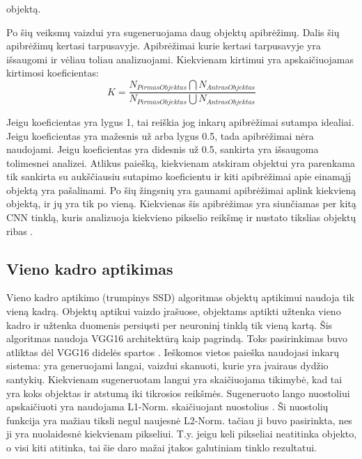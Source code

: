 \documentclass{VUMIFInfKursinis}
\begin{document}
objektą. \cite{salt15}
\par
Po šių veiksmų vaizdui yra sugeneruojama daug objektų apibrėžimų. Dalis šių apibrėžimų
kertasi tarpusavyje. Apibrėžimai kurie kertasi tarpusavyje yra išsaugomi ir vėliau
toliau analizuojami. \cite{salt15} Kiekvienam kirtimui yra apskaičiuojamas kirtimosi koeficientas:
\[
  K = \frac{N_{PirmasObjektas} \bigcap N_{AntrasObjektas}}{N_{PirmasObjektas} \bigcup N_{AntrasObjektas}}
\]
\par
Jeigu koeficientas yra lygus 1, tai reiškia jog inkarų apibrėžimai sutampa idealiai.
Jeigu koeficientas yra mažesnis už arba lygus 0.5, tada apibrėžimai nėra naudojami.
Jeigu koeficientas yra didesnis už 0.5, sankirta yra išsaugoma tolimesnei analizei.
Atlikus paiešką, kiekvienam atskiram objektui yra parenkama tik sankirta su aukščiausiu
sutapimo koeficientu ir kiti apibrėžimai apie einamąjį objektą yra pašalinami.
Po šių žingsnių yra gaunami apibrėžimai aplink kiekvieną objektą, ir jų yra tik po
vieną. Kiekvienas šis apibrėžimas yra siunčiamas per kitą CNN tinklą, kuris analizuoja
kiekvieno pikselio reikšmę ir nustato tikslias objektų ribas \cite{salt15}.

\subsection{Vieno kadro aptikimas}
\par
Vieno kadro aptikimo (trumpinys SSD) algoritmas objektų aptikimui naudoja tik vieną kadrą.
Objektų aptikui vaizdo įrašuose, objektams aptikti užtenka vieno kadro ir užtenka
duomenis persiųsti per neuroninį tinklą tik vieną kartą. Šis algoritmas
naudoja VGG16 architektūrą kaip pagrindą. Toks pasirinkimas buvo atliktas dėl VGG16
didelės spartos \cite{salt20}. Ieškomos vietos paieška naudojasi inkarų sistema:
yra generuojami langai, vaizdui skanuoti, kurie yra įvairaus dydžio santykių.
Kiekvienam sugeneruotam langui yra skaičiuojama tikimybė, kad tai yra koks objektas
ir atstumą iki tikrosios reikšmės. Sugeneruoto lango nuostoliui apskaičiuoti
yra naudojama L1-Norm. skaičiuojant nuostolius \cite{salt20}. Ši nuostolių funkcija
yra mažiau tiksli negul naujesnė L2-Norm. tačiau ji buvo pasirinkta, nes ji yra nuolaidesnė
kiekvienam pikseliui. T.y. jeigu keli pikseliai neatitinka objekto, o visi kiti atitinka,
tai šie daro mažai įtakos galutiniam tinklo rezultatui.
\end{document}
